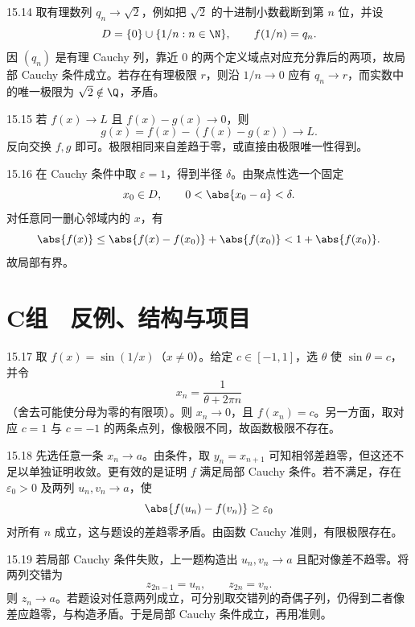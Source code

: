 \begin{solution}{15.14}
取有理数列 \(q_n\to\sqrt2\)，例如把 \(\sqrt2\) 的十进制小数截断到第 \(n\) 位，并设
\[
 D=\{0\}\cup\{1/n:n\in\N\},\qquad f(1/n)=q_n.
\]
因 \((q_n)\) 是有理 Cauchy 列，靠近 \(0\) 的两个定义域点对应充分靠后的两项，故局部 Cauchy 条件成立。若存在有理极限 \(r\)，则沿 \(1/n\to0\) 应有 \(q_n\to r\)，而实数中的唯一极限为 \(\sqrt2\notin\Q\)，矛盾。
\end{solution}

\begin{solution}{15.15}
若 \(f(x)\to L\) 且 \(f(x)-g(x)\to0\)，则
\[
 g(x)=f(x)-(f(x)-g(x))\to L.
\]
反向交换 \(f,g\) 即可。极限相同来自差趋于零，或直接由极限唯一性得到。
\end{solution}

\begin{solution}{15.16}
在 Cauchy 条件中取 \(\varepsilon=1\)，得到半径 \(\delta\)。由聚点性选一个固定
\[
 x_0\in D,\qquad0<\abs{x_0-a}<\delta.
\]
对任意同一删心邻域内的 \(x\)，有
\[
 \abs{f(x)}\le\abs{f(x)-f(x_0)}+\abs{f(x_0)}
 <1+\abs{f(x_0)}.
\]
故局部有界。
\end{solution}

\section*{C组　反例、结构与项目}

\begin{solution}{15.17}
取 \(f(x)=\sin(1/x)\)（\(x\ne0\)）。给定 \(c\in[-1,1]\)，选 \(\theta\) 使 \(\sin\theta=c\)，并令
\[
 x_n=\frac1{\theta+2\pi n}
\]
（舍去可能使分母为零的有限项）。则 \(x_n\to0\)，且 \(f(x_n)=c\)。另一方面，取对应 \(c=1\) 与 \(c=-1\) 的两条点列，像极限不同，故函数极限不存在。
\end{solution}

\begin{solution}{15.18}
先选任意一条 \(x_n\to a\)。由条件，取 \(y_n=x_{n+1}\) 可知相邻差趋零，但这还不足以单独证明收敛。更有效的是证明 \(f\) 满足局部 Cauchy 条件。若不满足，存在 \(\varepsilon_0>0\) 及两列 \(u_n,v_n\to a\)，使
\[
 \abs{f(u_n)-f(v_n)}\ge\varepsilon_0
\]
对所有 \(n\) 成立，这与题设的差趋零矛盾。由函数 Cauchy 准则，有限极限存在。
\end{solution}

\begin{solution}{15.19}
若局部 Cauchy 条件失败，上一题构造出 \(u_n,v_n\to a\) 且配对像差不趋零。将两列交错为
\[
 z_{2n-1}=u_n,\qquad z_{2n}=v_n.
\]
则 \(z_n\to a\)。若题设对任意两列成立，可分别取交错列的奇偶子列，仍得到二者像差应趋零，与构造矛盾。于是局部 Cauchy 条件成立，再用准则。
\end{solution}

